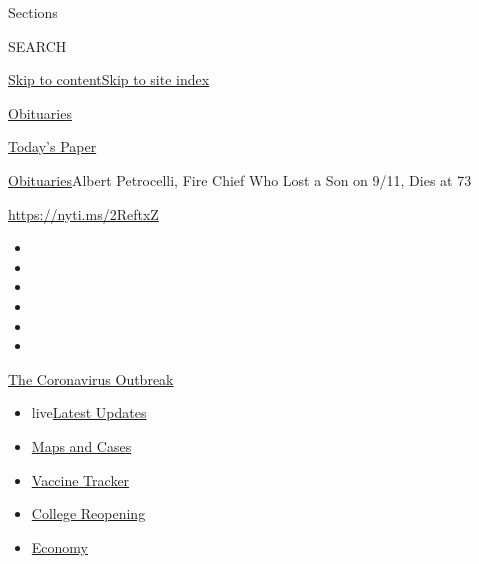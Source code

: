 Sections

SEARCH

\protect\hyperlink{site-content}{Skip to
content}\protect\hyperlink{site-index}{Skip to site index}

\href{https://www.nytimes.com/section/obituaries}{Obituaries}

\href{https://myaccount.nytimes.com/auth/login?response_type=cookie\&client_id=vi}{}

\href{https://www.nytimes.com/section/todayspaper}{Today's Paper}

\href{/section/obituaries}{Obituaries}\textbar{}Albert Petrocelli, Fire
Chief Who Lost a Son on 9/11, Dies at 73

\url{https://nyti.ms/2ReftxZ}

\begin{itemize}
\item
\item
\item
\item
\item
\item
\end{itemize}

\href{https://www.nytimes.com/news-event/coronavirus?action=click\&pgtype=Article\&state=default\&region=TOP_BANNER\&context=storylines_menu}{The
Coronavirus Outbreak}

\begin{itemize}
\tightlist
\item
  live\href{https://www.nytimes.com/2020/08/03/world/coronavirus-covid-19.html?action=click\&pgtype=Article\&state=default\&region=TOP_BANNER\&context=storylines_menu}{Latest
  Updates}
\item
  \href{https://www.nytimes.com/interactive/2020/us/coronavirus-us-cases.html?action=click\&pgtype=Article\&state=default\&region=TOP_BANNER\&context=storylines_menu}{Maps
  and Cases}
\item
  \href{https://www.nytimes.com/interactive/2020/science/coronavirus-vaccine-tracker.html?action=click\&pgtype=Article\&state=default\&region=TOP_BANNER\&context=storylines_menu}{Vaccine
  Tracker}
\item
  \href{https://www.nytimes.com/2020/08/02/us/covid-college-reopening.html?action=click\&pgtype=Article\&state=default\&region=TOP_BANNER\&context=storylines_menu}{College
  Reopening}
\item
  \href{https://www.nytimes.com/live/2020/08/03/business/stock-market-today-coronavirus?action=click\&pgtype=Article\&state=default\&region=TOP_BANNER\&context=storylines_menu}{Economy}
\end{itemize}


